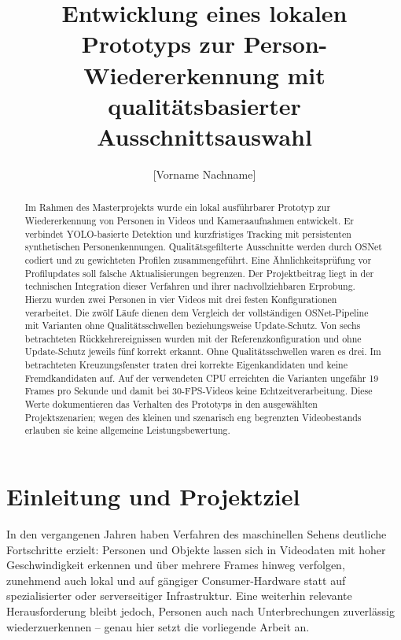 \documentclass[runningheads,a4paper]{llncs}
\newcommand{\todoentry}[1]{\textcolor{red!70!black}{[#1]}}
\begin{document}
\title{Entwicklung eines lokalen Prototyps zur Person-Wiedererkennung mit qualitätsbasierter Ausschnittsauswahl}

\author{\todoentry{Vorname Nachname}}
\authorrunning{\todoentry{Nachname}}
\institute{\todoentry{Hochschule für angewandte Wissenschaften}\\
\todoentry{Fakultät / Masterstudiengang / Modul}\\
\email{\todoentry{hochschul-email@example.org}}}

\maketitle

\begin{abstract}
Im Rahmen des Masterprojekts wurde ein lokal ausführbarer Prototyp zur Wiedererkennung von Personen in Videos und Kameraaufnahmen entwickelt. Er verbindet YOLO-basierte Detektion und kurzfristiges Tracking mit persistenten synthetischen Personenkennungen. Qualitätsgefilterte Ausschnitte werden durch OSNet codiert und zu gewichteten Profilen zusammengeführt. Eine Ähnlichkeitsprüfung vor Profilupdates soll falsche Aktualisierungen begrenzen. Der Projektbeitrag liegt in der technischen Integration dieser Verfahren und ihrer nachvollziehbaren Erprobung. Hierzu wurden zwei Personen in vier Videos mit drei festen Konfigurationen verarbeitet. Die zwölf Läufe dienen dem Vergleich der vollständigen OSNet-Pipeline mit Varianten ohne Qualitätsschwellen beziehungsweise Update-Schutz. Von sechs betrachteten Rückkehrereignissen wurden mit der Referenzkonfiguration und ohne Update-Schutz jeweils fünf korrekt erkannt. Ohne Qualitätsschwellen waren es drei. Im betrachteten Kreuzungsfenster traten drei korrekte Eigenkandidaten und keine Fremdkandidaten auf. Auf der verwendeten CPU erreichten die Varianten ungefähr 19 Frames pro Sekunde und damit bei 30-FPS-Videos keine Echtzeitverarbeitung. Diese Werte dokumentieren das Verhalten des Prototyps in den ausgewählten Projektszenarien; wegen des kleinen und szenarisch eng begrenzten Videobestands erlauben sie keine allgemeine Leistungsbewertung.
\end{abstract}

\section{Einleitung und Projektziel}
In den vergangenen Jahren haben Verfahren des maschinellen Sehens deutliche Fortschritte erzielt: Personen und Objekte lassen sich in Videodaten mit hoher Geschwindigkeit erkennen und über mehrere Frames hinweg verfolgen, zunehmend auch lokal und auf gängiger Consumer-Hardware statt auf spezialisierter oder serverseitiger Infrastruktur. Eine weiterhin relevante Herausforderung bleibt jedoch, Personen auch nach Unterbrechungen zuverlässig wiederzuerkennen -- genau hier setzt die vorliegende Arbeit an.
\end{document}
